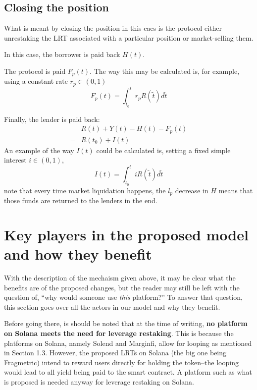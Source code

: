 \documentclass{article}
\begin{document}




\subsection{Closing the position}
What is meant by closing the position in this caes is the protocol either unrestaking the LRT associated with a particular position or market-selling them. 

In this case, the borrower is paid back $H(t)$.

The protocol is paid $F_p(t)$. The way this may be calculated is, for example, using a constant rate $r_p \in (0, 1)$
$$
F_p(t) = \int_{t_0}^t r_p R(\tilde{t})d\tilde{t}
$$

Finally, the lender is paid back: 
\begin{align*}
 &R(t) + Y(t) - H(t) - F_p(t) \\
 = &R(t_0) + I(t) 
\end{align*}
An example of the way $I(t)$ could be calculated is, setting a fixed simple interest $i \in (0, 1)$,
$$
I(t) = \int_{t_0}^t iR(\tilde{t})d\tilde{t}
$$
note that every time market liquidation happens, the $l_p$ decrease in $H$ means that those funds are returned to the lenders in the end.

\section{Key players in the proposed model and how they benefit}
With the description of the mechaism given above, it may be clear what the benefits are of the proposed changes, but the reader may still be left with the question of, ``why would someone use \textit{this} platform?'' To answer that question, this section goes over all the actors in our model and why they benefit.

Before going there, is should be noted that at the time of writing, \textbf{no platform on Solana meets the need for leverage restaking}. This is because the platforms on Solana, namely Solend and Marginfi, allow for looping as mentioned in Section 1.3. However, the proposed LRTs on Solana (the big one being Fragmetric) intend to reward users directly for holding the token--the looping would lead to all yield being paid to the smart contract. A platform such as what is proposed is needed anyway for leverage restaking on Solana.
\end{document}
